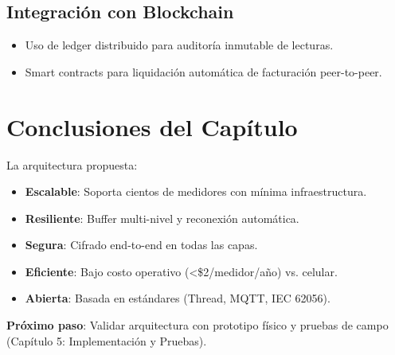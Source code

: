 \subsection{Integración con Blockchain}

\begin{itemize}
    \item Uso de ledger distribuido para auditoría inmutable de lecturas.
    \item Smart contracts para liquidación automática de facturación peer-to-peer.
\end{itemize}

\section{Conclusiones del Capítulo}

La arquitectura propuesta:
\begin{itemize}
    \item \textbf{Escalable}: Soporta cientos de medidores con mínima infraestructura.
    \item \textbf{Resiliente}: Buffer multi-nivel y reconexión automática.
    \item \textbf{Segura}: Cifrado end-to-end en todas las capas.
    \item \textbf{Eficiente}: Bajo costo operativo (<\$2/medidor/año) vs. celular.
    \item \textbf{Abierta}: Basada en estándares (Thread, MQTT, IEC 62056).
\end{itemize}

\textbf{Próximo paso}: Validar arquitectura con prototipo físico y pruebas de campo (Capítulo 5: Implementación y Pruebas).

